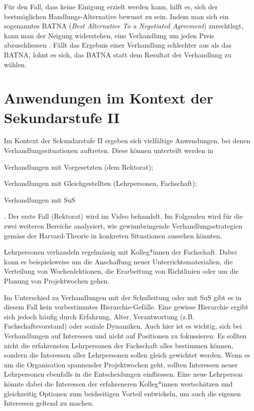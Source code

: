 Für den Fall, dass keine Einigung erzielt werden kann, hilft es, sich der bestmöglichen Handlungs-Alternative bewusst zu sein. Indem man sich ein sogenanntes BATNA (\textit{Best Alternative To a Negotiated Agreement}) zurechtlegt, kann man der Neigung widerstehen, eine Verhandlung um jeden Preis abzuschliessen \cite{elementeVerhandeln}. Fällt das Ergebnis einer Verhandlung schlechter aus als das BATNA, lohnt es sich, das BATNA statt dem Resultat der Verhandlung zu wählen.

 \section*{Anwendungen im Kontext der Sekundarstufe II}
Im Kontext der Sekundarstufe II ergeben sich vielfältige Anwendungen, bei denen Verhandlungssituationen auftreten. Diese können unterteilt werden in \begin{enumerate*}
\item Verhandlungen mit Vorgesetzten (dem Rektorat);\item Verhandlungen mit Gleichgestellten (Lehrpersonen, Fachschaft);\item Verhandlungen mit SuS
\end{enumerate*}. Der erste Fall (Rektorat) wird im Video behandelt. Im Folgenden wird für die zwei weiteren Bereiche analysiert, wie gewinnbringende Verhandlungsstrategien gemäss der Harvard-Theorie in konkreten Situationen aussehen könnten.

\begin{myExBox}[title={Anwendung 1: Verhandlung mit Gleichgestellten (Fachschaft, Lehrpersonen)}]
Lehrpersonen verhandeln regelmässig mit Kolleg*innen der Fachschaft. Dabei kann es beispielsweise um die Anschaffung neuer Unterrichtsmaterialien, die Verteilung von Wochenlektionen, die Erarbeitung von Richtlinien oder um die Planung von Projektwochen gehen.

Im Unterschied zu Verhandlungen mit der Schulleitung oder mit SuS gibt es in diesem Fall kein vorbestimmtes Hierarchie-Gefälle. Eine gewisse Hierarchie ergibt sich jedoch häufig durch Erfahrung, Alter, Verantwortung (z.B. Fachschaftsvorstand) oder soziale Dynamiken. Auch hier ist es wichtig, sich bei Verhandlungen auf Interessen und nicht auf Positionen zu fokussieren: Es sollten nicht die erfahrensten Lehrpersonen der Fachschaft alles bestimmen können, sondern die Interessen aller Lehrpersonen sollen gleich gewichtet werden. Wenn es um die Organisation spannender Projektwochen geht, sollten Interessen neuer Lehrpersonen ebenfalls in die Entscheidungen einfliessen. Eine neue Lehrperson könnte dabei die Interessen der erfahreneren Kolleg*innen wertschätzen und gleichzeitig Optionen zum beidseitigen Vorteil entwickeln, um auch die eigenen Interessen geltend zu machen.  

\end{myExBox}

